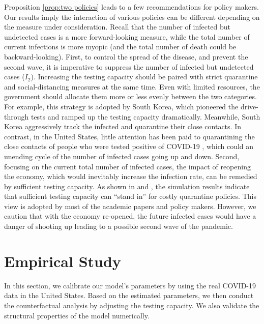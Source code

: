 \documentclass[nonblindrev, copyedit]{informs3a}
\newcounter{prop}[chapter]
\begin{document}
Proposition \ref{prop:two policies} leads to a few recommendations for policy makers. 
Our results imply the interaction of various policies can be different depending on the measure under consideration. Recall that the number of infected but undetected cases is a more forward-looking measure, while the total number of current infections is more myopic (and the total number of death could be backward-looking). 
First, to control the spread of the disease, and prevent the second wave, it is imperative to suppress the number of infected but undetected cases ($I_2$).
Increasing the testing capacity should be paired with strict quarantine and social-distancing measures at the same time. 
Even with limited resources, the government should allocate them more or less evenly between the two categories.
For example, this strategy is adopted by South Korea, which pioneered the drive-through tests and ramped  up the testing capacity dramatically. 
Meanwhile, South Korea aggressively track the infected and quarantine their close contacts. 
In contrast, in the United States, little attention has been paid to quarantining the close contacts of people who were tested positive of COVID-19 \citep{Sharfstein2020testing}, which could an unending cycle of the number of infected cases going up and down.  
Second, focusing on the current total number of infected cases, the impact of reopening the economy, which would inevitably increase the infection rate, can be remedied by sufficient testing capacity.
As shown in \citet{berger2020seir} and \citet{housni2020can}, the simulation results indicate that sufficient testing capacity can ``stand in'' for costly quarantine policies.
This view is adopted by most of the academic papers and policy makers. However, we caution that with the economy re-opened, the future infected cases would have a danger of shooting up leading to a possible second wave of the pandemic. 


\section{Empirical Study}\label{sec:empirical}
In this section, we calibrate our model's parameters by using the real COVID-19 data in the United States.
Based on the estimated parameters, we then conduct the counterfactual analysis by adjusting the testing capacity.
We also validate the structural properties of the model numerically.
\end{document}
